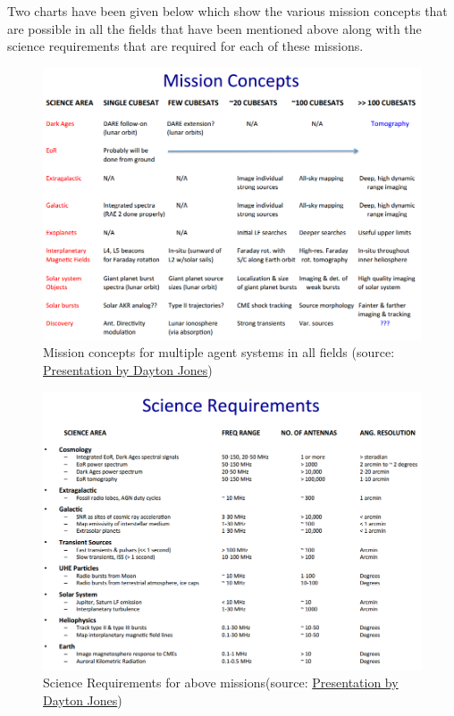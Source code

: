 \vspace{1cm}

Two charts have been given below which show the various mission concepts that are possible in all the fields that have been mentioned above along with the science requirements that are required for each of these missions. 
\begin{figure}[!ht]
\includegraphics[scale=0.7]{mission_concepts.png}
\caption{Mission concepts for multiple agent systems in all fields (source: \href{http://kiss.caltech.edu/workshops/smallsat2012/presentations/low_freq_missions.pdf}{Presentation by Dayton Jones})}
\end{figure}

\begin{figure}[!ht]
\includegraphics[scale=0.7]{science_req.png}
\caption{Science Requirements for above missions(source: \href{http://kiss.caltech.edu/cosponsored/cubesat2012/presentations/low_freq_science_req.pdf}{Presentation by Dayton Jones})}
\end{figure}
\newpage

